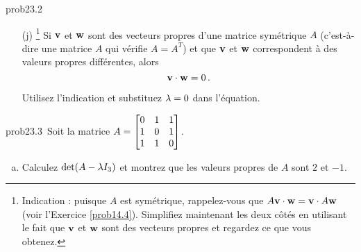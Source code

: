 \begin{sol}{prob23.2}
\begin{enumerate}[]
\item[(j)]\footnote{ Indication : puisque $A$ est symétrique, rappelez-vous que $A\mathbf{v}\cdot \mathbf{w}=\mathbf{v}\cdot A\mathbf{w}$ (voir l'Exercice \ref{prob14.4}). Simplifiez maintenant les deux côtés en utilisant le fait que $\mathbf{v}$ et $\mathbf{w}$ sont des vecteurs propres et regardez ce que vous obtenez.} Si $\mathbf{v}$ et $\mathbf{w}$ sont des vecteurs propres d'une matrice symétrique $A$ (c'est-à-dire une matrice $A$ qui vérifie $A=A^T$) et que $\mathbf{v}$ et $\mathbf{w}$ correspondent à des valeurs propres différentes, alors $$\mathbf{v} \cdot \mathbf{w}=0\,.$$  

\soln Utilisez l'indication et substituez $\lambda=0$ dans l'équation.
\medskip


\end{enumerate}
\end{sol}

\bigskip
\begin{sol}{prob23.3}~Soit la matrice $A=\bmatrix
0&1&1\\ 1&0&1\\ 1&1&0 \endbmatrix$. 

\begin{enumerate}[a)]
\medskip
\item Calculez $\det(A-\lambda I_3)$ et montrez que les valeurs propres de
$A$ sont $2$ et $-1$.


\end{enumerate}
\end{sol}
